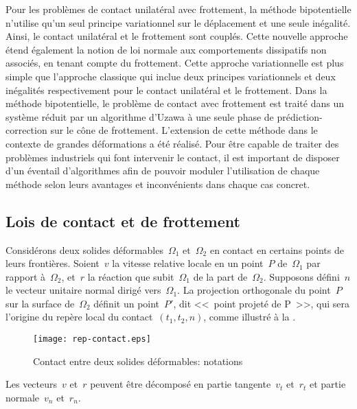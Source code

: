 Pour les problèmes de contact unilatéral avec frottement, la méthode bipotentielle n'utilise qu'un seul
principe variationnel sur le déplacement et une seule inégalité.
Ainsi, le contact unilatéral et le frottement sont couplés.
Cette nouvelle approche étend également la notion de loi normale aux comportements dissipatifs non
associés, en tenant compte du frottement.
Cette approche variationnelle est plus simple que l'approche classique qui inclue deux principes variationnels
et deux inégalités respectivement pour le contact unilatéral et le frottement.
Dans la méthode bipotentielle, le problème de contact avec frottement est traité dans un système
réduit par un algorithme d'Uzawa à une seule phase de prédiction-correction sur le cône de frottement.
L'extension de cette méthode dans le contexte de grandes déformations a été réalisé.
Pour être capable de traiter des problèmes industriels qui font intervenir le contact, il est important
de disposer d'un éventail d'algorithmes afin de pouvoir moduler l'utilisation de chaque méthode selon leurs
avantages et inconvénients dans chaque cas concret.

\medskip
\subsection{Lois de contact et de frottement}

Considérons deux solides déformables~$\Omega_1$ et~$\Omega_2$ en contact en certains
points de leurs frontières.
Soient~$v$ la vitesse relative locale en un point~$P$ de~$\Omega_1$ par rapport à~$\Omega_2$,
et~$r$ la réaction que subit~$\Omega_1$ de la part de~$\Omega_2$.
Supposons défini~$n$ le vecteur unitaire normal dirigé vers~$\Omega_1$.
La projection orthogonale du point~$P$ sur la surface de~$\Omega_2$ définit un point~$P'$, dit
<<~point projeté de P~>>, qui sera l'origine du repère local du contact~$(t_1, t_2, n)$,
comme illustré à la .
\begin{figure}[htb]
\centerline{\texttt{[image: rep-contact.eps]}}
\caption{Contact entre deux solides déformables: notations}\label{Fig-rep-contact}
\end{figure}

Les vecteurs~$v$ et~$r$ peuvent être décomposé en partie tangente~$v_t$ et~$r_t$ et partie
normale~$v_n$ et~$r_n$.

